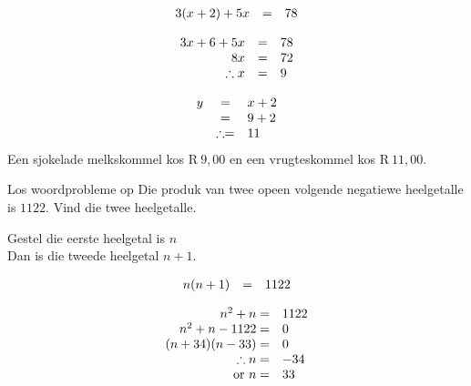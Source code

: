 \begin{aktiwiteit}{}
\begin{wex}
{
\begin{equation*}
\begin{array}{ccl}\hfill 3(x+2)+5x& =& 78\hfill \\
\end{array}
\end{equation*}

\begin{equation*}
\begin{array}{ccl}
 \hfill 3x+6+5x& =& 78\hfill \\ 
\hfill 8x& =& 72\hfill \\ 
\hfill \therefore x& =& 9\hfill \\  \end{array}
\end{equation*}

\begin{equation*}
\begin{array}{ccl}
\hfill y& =& x+2\hfill \\
 \hfill & =& 9+2\hfill \\ 
\hfill & \therefore =& 11\hfill  \end{array}
\end{equation*}
Een sjokelade melkskommel kos R$~9,00$ en een vrugteskommel
kos R$~ 11,00$.
}
\end{wex}

\begin{wex}
{Los woordprobleme op }
{
Die produk van twee opeen volgende negatiewe heelgetalle is $1122$. Vind die twee heelgetalle.
} 
{
Gestel die eerste heelgetal is $n$ 
\\Dan is die tweede heelgetal $n+1$.\par 

\begin{equation*}
\begin{array}{cll}\hfill n(n+1)& =& 1122\hfill \end{array}
\end{equation*}

\begin{equation*}
    \begin{array}{cll}
	\hfill n^{2} + n =& 1122\hfill \\
\hfill n^{2} + n - 1122 =& 0\hfill \\
\hfill (n+34)(n-33) =& 0\hfill \\
	\hfill \therefore  n =& -34 \hfill \\
\hfill \mbox{ or } n =& 33\hfill 
    \end{array}
\end{equation*}

}
\end{wex}
\end{aktiwiteit}
